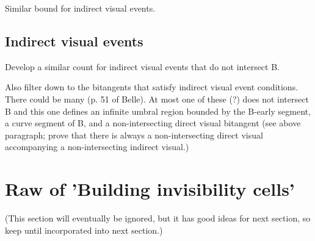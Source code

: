 \documentclass[12pt]{article}
\begin{document}
\begin{theorem}
Similar bound for indirect visual events.
\end{theorem}

\subsection{Indirect visual events}

Develop a similar count for indirect visual events that do not intersect B.

Also filter down to the bitangents that satisfy indirect visual event conditions.
There could be many (p. 51 of Belle).
At most one of these (?) does not intersect B and this one defines an infinite
umbral region bounded by the B-early segment, a curve segment of B, and
a non-intersecting direct visual bitangent (see above paragraph; prove that there
is always a non-intersecting direct visual accompanying a non-intersecting indirect visual.)




\clearpage


\section{Raw of 'Building invisibility cells'}

(This section will eventually be ignored, 
but it has good ideas for next section, so keep until
incorporated into next section.)
\end{document}
